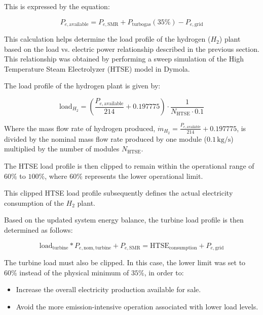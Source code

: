 This is expressed by the equation:

\begin{equation}
  P_{e, \mathrm{available}} = P_{e, \mathrm{SMR}} + P_{\mathrm{turbogas}}(35\%) - P_{e, \mathrm{grid}}
\end{equation}

This calculation helps determine the load profile of the hydrogen ($H_2$) plant based on the load vs. electric power relationship described in the previous section. This relationship was obtained by performing a sweep simulation of the High Temperature Steam Electrolyzer (HTSE) model in Dymola.

The load profile of the hydrogen plant is given by:

\begin{equation}
  \mathrm{load}_{H_2} = \left( \frac{P_{e, \mathrm{available}}}{214} + 0.197775 \right) \cdot \frac{1}{N_{\mathrm{HTSE}} \cdot 0.1}
\end{equation}

Where the mass flow rate of hydrogen produced, $\dot{m}_{H_2} = \frac{P_{e, \mathrm{available}}}{214} + 0.197775$, is divided by the nominal mass flow rate produced by one module ($0.1\,\mathrm{kg/s}$) multiplied by the number of modules $N_{\mathrm{HTSE}}$.

The HTSE load profile is then clipped to remain within the operational range of $60\%$ to $100\%$, where $60\%$ represents the lower operational limit.

This clipped HTSE load profile subsequently defines the actual electricity consumption of the $H_2$ plant.

Based on the updated system energy balance, the turbine load profile is then determined as follows:

\begin{equation}
  \mathrm{load}_{\mathrm{turbine}} * P_{e, \mathrm{nom, turbine}} + P_{e, \mathrm{SMR}} = \mathrm{HTSE}_{\mathrm{consumption}} + P_{e, \mathrm{grid}}
\end{equation}

The turbine load must also be clipped. In this case, the lower limit was set to $60\%$ instead of the physical minimum of $35\%$, in order to:

\begin{itemize}
  \item Increase the overall electricity production available for sale.
  \item Avoid the more emission-intensive operation associated with lower load levels.
\end{itemize}

